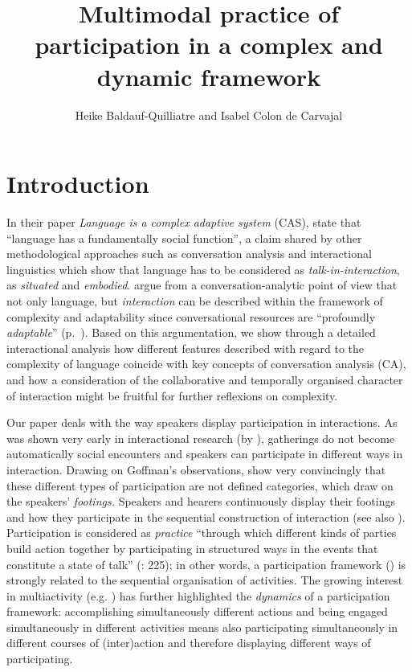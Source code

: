 \documentclass[output=paper]{langscibook}
\author{Heike Baldauf-Quilliatre\affiliation{UMR 5161 ICAR; Centre National de la Recherche Scientifique; Ecole Normale Supérieure; Université Lumière Lyon 2}
        and Isabel {Colon de Carvajal}\affiliation{UMR 5161 ICAR; Centre National de la Recherche Scientifique; Ecole Normale Supérieure; Université Lumière Lyon 2}}
\title{Multimodal practice of participation in a complex and dynamic framework}
\begin{document}
\maketitle 

\section{Introduction}


In their paper \textit{Language is a complex adaptive system} (CAS), \citet[1]{BecknerEtAl2009} state that “language has a fundamentally social function”, a claim shared by other methodological approaches such as conversation analysis and interactional linguistics which show that language has to be considered as \textit{talk-in-interaction}, as \textit{situated} and \textit{embodied}.  argue from a conversation-analytic point of view that not only language, but \textit{interaction} can be described within the framework of complexity and adaptability since conversational resources are “profoundly \textit{adaptable}” (p.~\pageref{Ch12:profoundlyadaptable}). Based on this argumentation, we show through a detailed interactional analysis how different features described with regard to the complexity of language coincide with key concepts of conversation analysis (CA), and how a consideration of the collaborative and temporally organised character of interaction might be fruitful for further reflexions on complexity.

Our paper deals with the way speakers display participation in interactions. As was shown very early in interactional research (by \citealt{Goffman1981}), gatherings do not become automatically social encounters and speakers can participate in different ways in interaction. Drawing on Goffman’s observations, \citet{GoodwinGoodwin2004} show very convincingly that these different types of participation are not defined categories, which draw on the speakers’ \textit{footings.} Speakers and hearers continuously display their footings and how they participate in the sequential construction of interaction (see also ). Participation is considered as \textit{practice} “through which different kinds of parties build action together by participating in structured ways in the events that constitute a state of talk” (\citeyear{GoodwinGoodwin2004}: 225); in other words, a participation framework (\citealt{GoodwinGoodwin1992}) is strongly related to the sequential organisation of activities. The growing interest in multiactivity (e.g. \citealt{HaddingtonEtAl2014}) has further highlighted the \textit{dynamics} of a participation framework: accomplishing simultaneously different actions and being engaged simultaneously in different activities means also participating simultaneously in different courses of (inter)action and therefore displaying different ways of participating.
\end{document}
